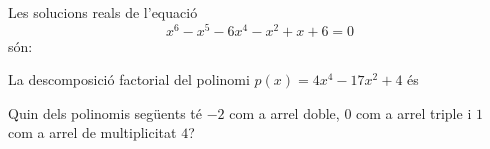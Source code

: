 \begin{enumerate}
\begin{enumerate}[label=\alph*)]




\end{enumerate}

\feedback

\pregunta Les solucions reals de l'equació\begin{equation*}
x^{6}-x^{5}-6x^{4}-x^{2}+x+6=0 
\end{equation*}són:

\begin{enumerate}[label=\alph*)]





\end{enumerate}

\feedback

\pregunta La descomposició factorial del polinomi $p(x)=4x^{4}-17x^{2}+4$ és

\begin{enumerate}[label=\alph*)]





\end{enumerate}

\feedback

\pregunta Quin dels polinomis següents té $-2$ com a arrel doble, $0$
com a arrel triple i $1$ com a arrel de multiplicitat $4$?

\begin{enumerate}[label=\alph*)]





\end{enumerate}

\feedback

\end{enumerate}

\bigskip

